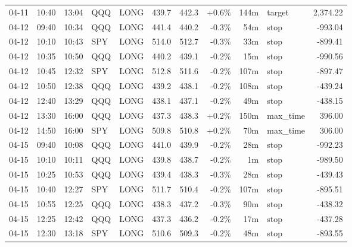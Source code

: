 \documentclass[11pt,a4paper,twoside]{article}
\begin{document}
\begin{center}
\begin{longtable}{>{\color{txtmain}}l l l l l r r r r >{\color{txtmain}}l r}
04-11 & 10:40 & 13:04 & QQQ & LONG & 439.7 & 442.3 & \textcolor{wingreen}{+0.6\%} & 144m & target & \textcolor{wingreen}{2,374.22} \\
04-12 & 09:40 & 10:34 & QQQ & LONG & 441.4 & 440.2 & \textcolor{lossred}{-0.3\%} & 54m & stop & \textcolor{lossred}{-993.04} \\
04-12 & 10:10 & 10:43 & SPY & LONG & 514.0 & 512.7 & \textcolor{lossred}{-0.3\%} & 33m & stop & \textcolor{lossred}{-899.41} \\
04-12 & 10:35 & 10:50 & QQQ & LONG & 440.2 & 439.1 & \textcolor{lossred}{-0.2\%} & 15m & stop & \textcolor{lossred}{-990.56} \\
04-12 & 10:45 & 12:32 & SPY & LONG & 512.8 & 511.6 & \textcolor{lossred}{-0.2\%} & 107m & stop & \textcolor{lossred}{-897.47} \\
04-12 & 10:50 & 12:38 & QQQ & LONG & 439.2 & 438.1 & \textcolor{lossred}{-0.2\%} & 108m & stop & \textcolor{lossred}{-439.24} \\
04-12 & 12:40 & 13:29 & QQQ & LONG & 438.1 & 437.1 & \textcolor{lossred}{-0.2\%} & 49m & stop & \textcolor{lossred}{-438.15} \\
04-12 & 13:30 & 16:00 & QQQ & LONG & 437.3 & 438.3 & \textcolor{wingreen}{+0.2\%} & 150m & max\_time & \textcolor{wingreen}{396.00} \\
04-12 & 14:50 & 16:00 & SPY & LONG & 509.8 & 510.8 & \textcolor{wingreen}{+0.2\%} & 70m & max\_time & \textcolor{wingreen}{306.00} \\
04-15 & 09:40 & 10:08 & QQQ & LONG & 441.0 & 439.9 & \textcolor{lossred}{-0.2\%} & 28m & stop & \textcolor{lossred}{-992.23} \\
04-15 & 10:10 & 10:11 & QQQ & LONG & 439.8 & 438.7 & \textcolor{lossred}{-0.2\%} & 1m & stop & \textcolor{lossred}{-989.50} \\
04-15 & 10:25 & 10:53 & QQQ & LONG & 439.4 & 438.3 & \textcolor{lossred}{-0.3\%} & 28m & stop & \textcolor{lossred}{-439.43} \\
04-15 & 10:40 & 12:27 & SPY & LONG & 511.7 & 510.4 & \textcolor{lossred}{-0.2\%} & 107m & stop & \textcolor{lossred}{-895.51} \\
04-15 & 10:55 & 12:25 & QQQ & LONG & 438.3 & 437.2 & \textcolor{lossred}{-0.3\%} & 90m & stop & \textcolor{lossred}{-438.32} \\
04-15 & 12:25 & 12:42 & QQQ & LONG & 437.3 & 436.2 & \textcolor{lossred}{-0.2\%} & 17m & stop & \textcolor{lossred}{-437.28} \\
04-15 & 12:30 & 13:18 & SPY & LONG & 510.6 & 509.3 & \textcolor{lossred}{-0.2\%} & 48m & stop & \textcolor{lossred}{-893.55} \\

\end{longtable}
\end{center}
\end{document}
